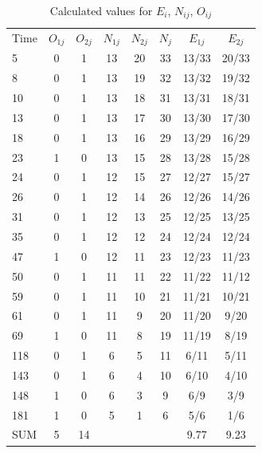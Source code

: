 \documentclass[10pt, a4paper]{article}
\begin{document}
%
%

\begin{center}
\begin{table}[h!]
\centering
\begin{tabular}{ l c c c c c c c }

 Time & $O_{1 j}$ & $O_{2 j}$ & $N_{1 j}$ & $N_{2 j}$ & $N_{j}$ & $E_{1 j}$ & $ E_{2 j} $ \\
  5 & 0 & 1 & 13 & 20 & 33 & 13/33 & 20/33\\
  8 & 0 & 1 & 13 & 19 & 32 & 13/32 & 19/32\\
 10 & 0 & 1 & 13 & 18 & 31 & 13/31 & 18/31\\
 13 & 0 & 1 & 13 & 17 & 30 & 13/30 & 17/30\\
 18 & 0 & 1 & 13 & 16 & 29 & 13/29 & 16/29\\
 23 & 1 & 0 & 13 & 15 & 28 & 13/28 & 15/28\\
 24 & 0 & 1 & 12 & 15 & 27 & 12/27 & 15/27\\
 26 & 0 & 1 & 12 & 14 & 26 & 12/26 & 14/26\\
 31 & 0 & 1 & 12 & 13 & 25 & 12/25 & 13/25\\
 35 & 0 & 1 & 12 & 12 & 24 & 12/24 & 12/24\\
 47 & 1 & 0 & 12 & 11 & 23 & 12/23 & 11/23\\
 50 & 0 & 1 & 11 & 11 & 22 & 11/22 & 11/12\\
 59 & 0 & 1 & 11 & 10 & 21 & 11/21 & 10/21\\
 61 & 0 & 1 & 11 &  9 & 20 & 11/20 &  9/20\\
 69 & 1 & 0 & 11 &  8 & 19 & 11/19 &  8/19\\
118 & 0 & 1 &  6 &  5 & 11 & 6/11  &  5/11\\
143 & 0 & 1 &  6 &  4 & 10 & 6/10  &  4/10\\
148 & 1 & 0 &  6 &  3 & 9  & 6/9   &   3/9\\
181 & 1 & 0 &  5 &  1 & 6  & 5/6   &   1/6\\

 \hline
 SUM & 5 & 14 & & & & 9.77 & 9.23
\end{tabular}
  \caption{Calculated values for $E_i$, $N_{i j}$, $O_{i j}$}
  \label{V}
\end{table}
\end{center}
\end{document}

